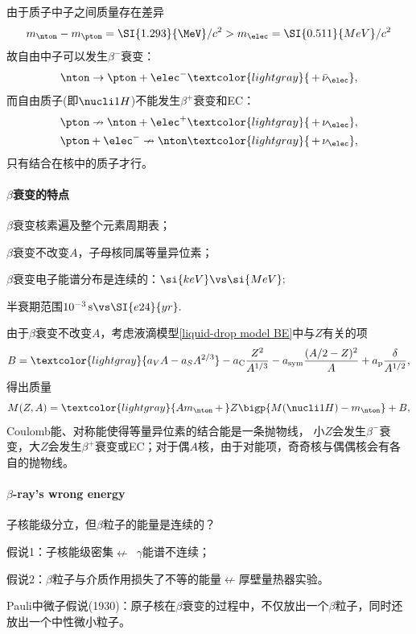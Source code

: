 由于质子中子之间质量存在差异
\[
	m_\nton - m_\pton = \SI{1.293}{\MeV}/c^2 > m_\elec = \SI{0.511}{MeV}/c^2
\]
故自由中子可以发生$\beta^-$衰变：
\[
	\nton\to\pton+\elec^-\textcolor{lightgray}{\,+\,\bar\nu_\elec},
\]
而自由质子(即$\nucli1H$)不能发生$\beta^+$衰变和EC：
\begin{gather*}
	\pton\nrightarrow \nton+\elec^+\textcolor{lightgray}{\,+\,\nu_\elec},\\
	\pton+\elec^-\nrightarrow \nton\textcolor{lightgray}{\,+\,\nu_\elec},
\end{gather*}
只有结合在核中的质子才行。

\paragraph{$\beta$衰变的特点}
\begin{compactenum}
	\item $\beta$衰变核素遍及整个元素周期表；
	\item $\beta$衰变不改变$A$，子母核同属等量异位素；
	\item $\beta$衰变电子能谱分布是连续的：$\si{keV}\vs\si{MeV};$
	\item 半衰期范围$10^{-3}\,\mathrm{s}\vs\SI{e24}{yr}.$
\end{compactenum}
由于$\beta$衰变不改变$A$，考虑液滴模型\eqref{liquid-drop model BE}中与$Z$有关的项
\[
	B=\textcolor{lightgray}{a_VA-a_SA^{2/3}}-a_\mathrm C\frac{Z^2}{A^{1/3}}-a_\mathrm{sym}\frac{(A/2-Z)^2}{A}+a_\mathrm p\frac{\delta}{A^{1/2}},
\]
得出质量
\[
	M(Z,A)=\textcolor{lightgray}{Am_\nton\,+\,}Z\bigp{M(\nucli1H)-m_\nton}+B,
\]
Coulomb能、对称能使得等量异位素的结合能是一条抛物线，%
小$Z$会发生$\beta^-$衰变，大$Z$会发生$\beta^+$衰变或EC；对于偶$A$核，由于对能项，奇奇核与偶偶核会有各自的抛物线。

\paragraph{$\beta$-ray's wrong energy}子核能级分立，但$\beta$粒子的能量是连续的？
\begin{compactitem}
	\item 假说1：子核能级密集$\nleftarrow$~$\gamma$能谱不连续；
	\item 假说2：$\beta$粒子与介质作用损失了不等的能量$\nleftarrow$厚壁量热器实验。
\end{compactitem}
Pauli中微子假说(1930)：原子核在$\beta$衰变的过程中，不仅放出一个$\beta$粒子，同时还放出一个中性微小粒子。
